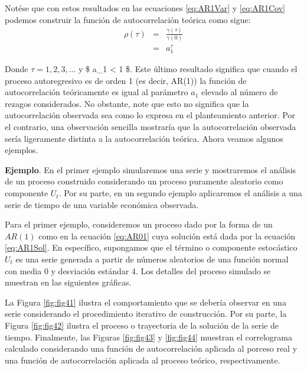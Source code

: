 \documentclass[
]{book}
\begin{document}
Notése que con estos resultados en las ecuaciones \eqref{eq:AR1Var} y \eqref{eq:AR1Cov} podemos construir la función de autocorrelación
teórica como sigue:
\begin{eqnarray}
    \rho(\tau) & = & \frac{\gamma(\tau)}{\gamma(0)} \nonumber \\
    & = & a_1^\tau
\end{eqnarray}

Donde \(\tau = 1, 2, 3, \ldots\) y \$ \textbar a\_1\textbar{} \textless{} 1 \$. Este último resultado significa que cuando el proceso autoregresivo es de orden 1 (es decir, AR(1)) la función de autocorrelación teóricamente es igual al parámetro \(a_1\) elevado al número de rezagos considerados. No obstante, note que esto no significa que la autocorrelación observada sea como lo expresa en el planteamiento anterior. Por el contrario, una observación sencilla mostraría que la autocorrelación observada sería ligeramente distinta a la autocorrelación teórica. Ahora veamos algunos ejemplos.

\textbf{Ejemplo}. En el primer ejemplo simularemos una serie y mostraremos el análisis de un proceso construido considerando un proceso puramente aleatorio como componente \(U_t\). Por su parte, en un segundo ejemplo aplicaremos el análisis a una serie de tiempo de una variable económica observada.

Para el primer ejemplo, consideremos un proceso dado por la forma de un \(AR(1)\) como en la ecuación \eqref{eq:AR01} cuya solución está dada por la ecuación \eqref{eq:AR1Sol}. En específico, supongamos que el término o componente estocástico \(U_t\) es una serie generada a partir de números aleatorios de una función normal con media \(0\) y desviación estándar \(4\). Los detalles del proceso simulado se muestran en las siguientes gráficas.

La Figura \ref{fig:fig41} ilustra el comportamiento que se debería observar en una serie considerando el procedimiento iterativo de construcción. Por su parte, la Figura \ref{fig:fig42} ilustra el proceso o trayectoria de la solución de la serie de tiempo. Finalmente, las Figuras \ref{fig:fig43} y \ref{fig:fig44} muestran el correlograma calculado considerando una función de autocorrelación aplicada al porceso real y una función de autocorrelación aplicada al proceso teórico, respectivamente.
\end{document}
